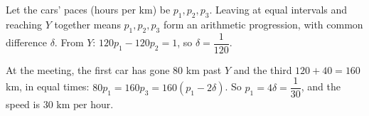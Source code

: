 Let the cars' paces (hours per km) be $p_1,p_2,p_3$. Leaving at equal intervals and reaching $Y$ together means $p_1,p_2,p_3$ form an arithmetic progression, with common difference $\delta$. From $Y$: $120p_1-120p_2=1$, so $\delta=\dfrac1{120}$.

At the meeting, the first car has gone $80$ km past $Y$ and the third $120+40=160$ km, in equal times: $80p_1=160p_3=160(p_1-2\delta)$. So $p_1=4\delta=\dfrac1{30}$, and the speed is $\boxed{30\text{ km per hour}}$.
